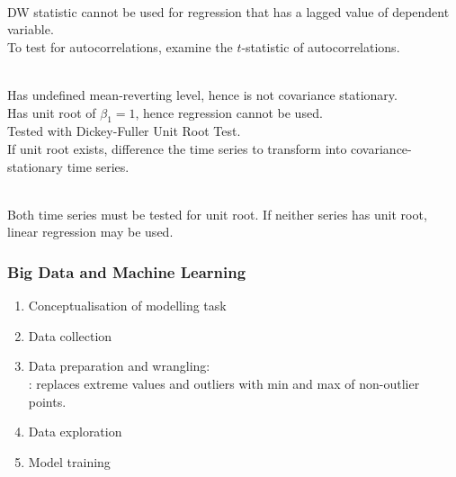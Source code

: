 \begin{method} \\
DW statistic cannot be used for regression that has a lagged value of dependent variable.\\
To test for autocorrelations, examine the $t$-statistic of autocorrelations.
\end{method}

\begin{method} \\
Has undefined mean-reverting level, hence is not covariance stationary.\\
Has unit root of $\beta_1 = 1$, hence regression cannot be used.\\
Tested with Dickey-Fuller Unit Root Test.\\
If unit root exists, difference the time series to transform into covariance-stationary time series.
\end{method}

\begin{method} \\
Both time series must be tested for unit root. If neither series has unit root, linear regression may be used.
\end{method}

\subsubsection{Big Data and Machine Learning}

\begin{method} 
\begin{enumerate}[label=\roman*.]
\setlength{\itemsep}{0pt}
\item Conceptualisation of modelling task
\item Data collection
\item Data preparation and wrangling:\\
: replaces extreme values and outliers with min and max of non-outlier points.
\item Data exploration
\item Model training
\end{enumerate}
\end{method}

